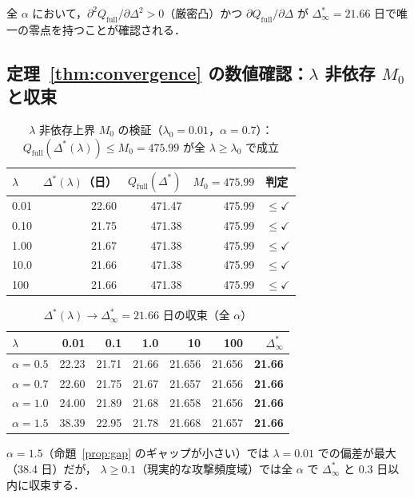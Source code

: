 \documentclass[12pt,a4paper]{article}
\theoremstyle{plain}
\theoremstyle{definition}
\theoremstyle{remark}
\newcommand{\Qf}{Q_{\mathrm{full}}}
\newcommand{\Dopt}{\Delta^{*}}
\newcommand{\Dinf}{\Delta^{*}_{\infty}}
\begin{document}
全 $\alpha$ において，$\partial^2\Qf/\partial\Delta^2>0$（厳密凸）かつ $\partial\Qf/\partial\Delta$ が
$\Dinf=21.66$ 日で唯一の零点を持つことが確認される．

\subsection{定理~\ref{thm:convergence} の数値確認：$\lambda$ 非依存 $M_0$ と収束}

\begin{table}[h]
\centering
\caption{$\lambda$ 非依存上界 $M_0$ の検証（$\lambda_0=0.01$，$\alpha=0.7$）：
$\Qf(\Dopt(\lambda))\le M_0=475.99$ が全 $\lambda\ge\lambda_0$ で成立}
\label{tab:compact}
\begin{tabular}{@{}lrrrl@{}}
\toprule
$\lambda$ & $\Dopt(\lambda)$（日）& $\Qf(\Dopt)$ & $M_0=475.99$ & 判定 \\
\midrule
0.01 & 22.60 & 471.47 & 475.99 & $\le\checkmark$ \\
0.10 & 21.75 & 471.38 & 475.99 & $\le\checkmark$ \\
1.00 & 21.67 & 471.38 & 475.99 & $\le\checkmark$ \\
10.0 & 21.66 & 471.38 & 475.99 & $\le\checkmark$ \\
100  & 21.66 & 471.38 & 475.99 & $\le\checkmark$ \\
\bottomrule
\end{tabular}
\end{table}

\begin{table}[h]
\centering
\caption{$\Dopt(\lambda)\to\Dinf=21.66$ 日の収束（全 $\alpha$）}
\label{tab:convergence}
\begin{tabular}{@{}lrrrrrr@{}}
\toprule
$\lambda$ & 0.01 & 0.1 & 1.0 & 10 & 100 & $\Dinf$ \\
\midrule
$\alpha=0.5$ & 22.23 & 21.71 & 21.66 & 21.656 & 21.656 & \textbf{21.66} \\
$\alpha=0.7$ & 22.60 & 21.75 & 21.67 & 21.657 & 21.656 & \textbf{21.66} \\
$\alpha=1.0$ & 24.00 & 21.89 & 21.68 & 21.658 & 21.656 & \textbf{21.66} \\
$\alpha=1.5$ & 38.39 & 22.95 & 21.78 & 21.668 & 21.657 & \textbf{21.66} \\
\bottomrule
\end{tabular}
\end{table}

$\alpha=1.5$（命題~\ref{prop:gap} のギャップが小さい）では $\lambda=0.01$ での偏差が最大（38.4 日）だが，
$\lambda\ge0.1$（現実的な攻撃頻度域）では全 $\alpha$ で $\Dinf$ と $0.3$ 日以内に収束する．
\end{document}
